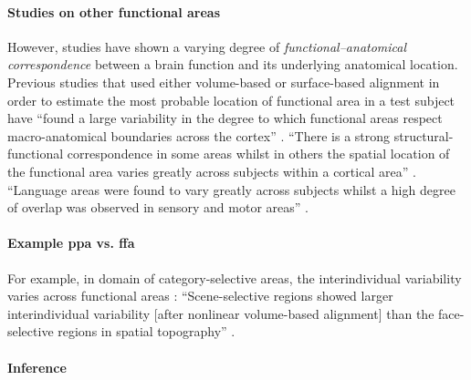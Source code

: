 \paragraph{Studies on other functional areas}
%
However, studies have shown a varying degree of \textit{functional--anatomical
correspondence} between a brain function and its underlying anatomical location.
%
Previous studies that used either volume-based \citep{zhen2017quantifying,
zhen2015quantifying} or surface-based alignment \citep{rosenke2021probabilistic,
frost2012measuring} in order to estimate the most probable location of
functional area in a test subject have ``found a large variability in the degree
to which functional areas respect macro-anatomical boundaries across the
cortex'' \citep{frost2012measuring}.
%
``There is a strong structural-functional correspondence in some areas whilst in
others the spatial location of the functional area varies greatly across
subjects within a cortical area'' \citep{frost2012measuring}.
%
``Language areas were found to vary greatly across subjects whilst a high degree
of overlap was observed in sensory and motor areas'' \citep{frost2012measuring}.


\paragraph{Example \ac{ppa} vs. \ac{ffa}}
%
For example, in domain of category-selective areas, the interindividual
variability varies across functional areas \citep{zhen2017quantifying,
zhen2015quantifying, frost2012measuring}:
%
``Scene-selective regions showed larger interindividual variability [after
nonlinear volume-based alignment] than the face-selective regions in spatial
topography'' \citep{zhen2017quantifying}.


\paragraph{Inference}




